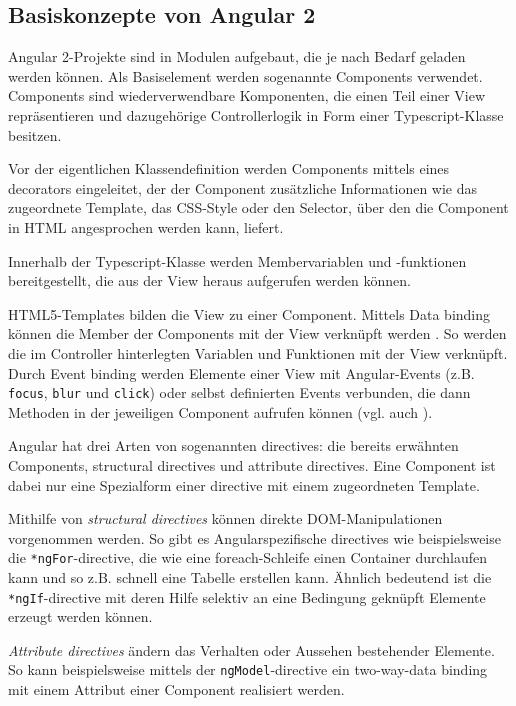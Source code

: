 \subsection{Basiskonzepte von Angular 2}
Angular 2-Projekte sind in Modulen aufgebaut, die je nach Bedarf geladen werden können. Als Basiselement werden sogenannte Components verwendet. Components sind wiederverwendbare Komponenten, die einen Teil einer View repräsentieren und dazugehörige Controllerlogik in Form einer Typescript-Klasse besitzen. 

Vor der eigentlichen Klassendefinition werden Components mittels eines decorators eingeleitet, der der Component zusätzliche Informationen wie das zugeordnete Template, das CSS-Style oder den Selector, über den die Component in HTML angesprochen werden kann, liefert.
%

Innerhalb der Typescript-Klasse werden Membervariablen und -funktionen bereitgestellt, die aus der View heraus aufgerufen werden können.

HTML5-Templates bilden die View zu einer Component. Mittels Data binding können die Member der Components mit der View verknüpft werden \cite{LynchAngularComponents}. So werden die im Controller hinterlegten Variablen und Funktionen mit der View verknüpft. Durch Event binding werden Elemente einer View mit Angular-Events (z.B. \texttt{focus}, \texttt{blur} und \texttt{click}) oder selbst definierten Events verbunden, die dann Methoden in der jeweiligen Component aufrufen können (vgl. auch  \cite{PrechtAngularTemplateSyntax}).

Angular hat drei Arten von sogenannten directives: die bereits erwähnten Components, structural directives und attribute directives. Eine Component ist dabei nur eine Spezialform einer directive mit einem zugeordneten Template.

Mithilfe von \emph{structural directives} können direkte DOM-Manipulationen vorgenommen werden. So gibt es Angularspezifische directives wie beispielsweise die  \texttt{*ngFor}-directive, die wie eine foreach-Schleife einen Container durchlaufen kann und so z.B. schnell eine Tabelle erstellen kann. Ähnlich bedeutend ist die \texttt{*ngIf}-directive mit deren Hilfe selektiv an eine Bedingung geknüpft Elemente erzeugt werden können.

\emph{Attribute directives} ändern das Verhalten oder Aussehen bestehender Elemente. So kann beispielsweise mittels der \texttt{ngModel}-directive ein two-way-data binding mit einem Attribut einer Component realisiert werden.

